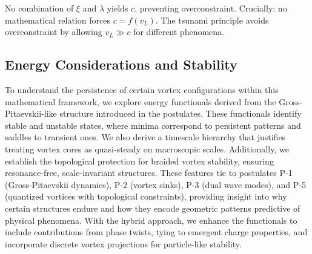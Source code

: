 No combination of $\xi$ and $\lambda$ yields $c$, preventing overconstraint. Crucially: no mathematical relation forces $c = f(v_L)$. The tsunami principle avoids overconstraint by allowing $v_L \gg c$ for different phenomena.

\medskip
\noindent
{}
\medskip

\subsection{Energy Considerations and Stability}

To understand the persistence of certain vortex configurations within this mathematical framework, we explore energy functionals derived from the Gross-Pitaevskii-like structure introduced in the postulates. These functionals identify stable and unstable states, where minima correspond to persistent patterns and saddles to transient ones. We also derive a timescale hierarchy that justifies treating vortex cores as quasi-steady on macroscopic scales. Additionally, we establish the topological protection for braided vortex stability, ensuring resonance-free, scale-invariant structures. These features tie to postulates P-1 (Gross-Pitaevskii dynamics), P-2 (vortex sinks), P-3 (dual wave modes), and P-5 (quantized vortices with topological constraints), providing insight into why certain structures endure and how they encode geometric patterns predictive of physical phenomena. With the hybrid approach, we enhance the functionals to include contributions from phase twists, tying to emergent charge properties, and incorporate discrete vortex projections for particle-like stability.

